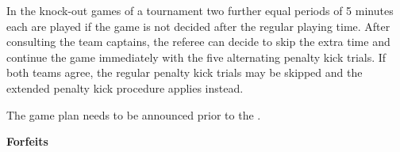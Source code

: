 \bigskip

In the knock-out games of a tournament two further equal periods of 5 minutes each are played if the game is not decided after the regular playing time.  After consulting the team captains, the referee can decide to skip the extra time and continue the game immediately with the five alternating penalty kick trials. If both teams agree, the regular penalty kick trials may be skipped and the extended penalty kick procedure applies instead.

\bigskip


The game plan needs to be announced prior to the 
.


\bigskip


\bigskip

{\bfseries Forfeits}

\headlinebox

